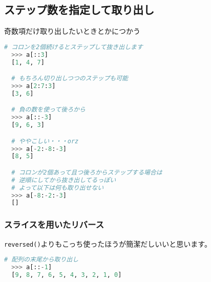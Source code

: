 \subsection{ステップ数を指定して取り出し}

奇数項だけ取り出したいときとかにつかう

\begin{lstlisting}[language=Python]
  # コロンを2個続けるとステップして抜き出します
  >>> a[::3]
  [1, 4, 7]

  # もちろん切り出しつつのステップも可能
  >>> a[2:7:3]
  [3, 6]

  # 負の数を使って後ろから
  >>> a[::-3]
  [9, 6, 3]

  # ややこしい・・・orz
  >>> a[-2:-8:-3]
  [8, 5]

  # コロンが2個あって且つ後ろからステップする場合は
  # 逆順にしてから抜き出してるっぽい
  # よって以下は何も取り出せない
  >>> a[-8:-2:-3]
  []
\end{lstlisting}

\subsubsection{スライスを用いたリバース}
\texttt{reversed()}よりもこっち使ったほうが簡潔だしいいと思います。

\begin{lstlisting}[language=Python]
  # 配列の末尾から取り出し
  >>> a[::-1]
  [9, 8, 7, 6, 5, 4, 3, 2, 1, 0]
\end{lstlisting}
